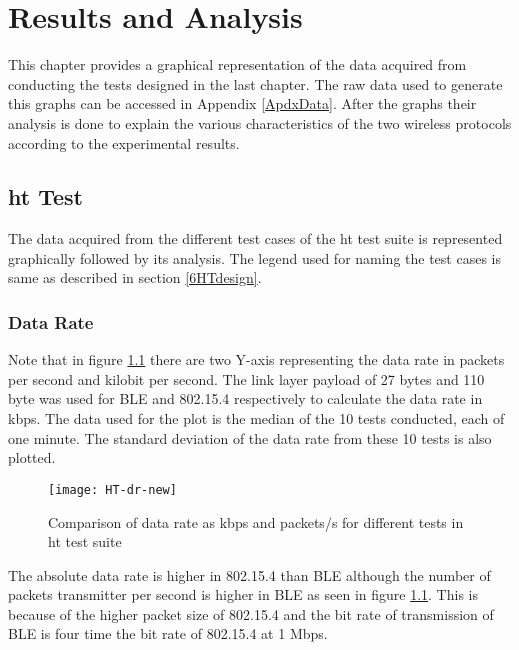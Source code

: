 \chapter{Results and Analysis} \label{7ResultsAnalysis}
This chapter provides a graphical representation of the data acquired from conducting the tests designed in the last chapter. The raw data used to generate this graphs can be accessed in Appendix \ref{ApdxData}. After the graphs their analysis is done to explain the various characteristics of the two wireless protocols according to the experimental results.

\section{\texorpdfstring{\acrlong{ht}}{High-Throughput} Test}
The data acquired from the different test cases of the \gls{ht} test suite is represented graphically followed by its analysis. The legend used for naming the test cases is same as described in section \ref{6HTdesign}.

\subsection{Data Rate}

Note that in figure \ref{fig:HT-dr} there are two Y-axis representing the data rate in packets per second and kilobit per second. The link layer payload of 27 bytes and 110 byte was used for BLE and 802.15.4 respectively to calculate the data rate in kbps. The data used for the plot is the median of the 10 tests conducted, each of one minute. The standard deviation of the data rate from these 10 tests is also plotted. 
\begin{figure}[tb]
\texttt{[image: HT-dr-new]}
\caption{Comparison of data rate as kbps and packets/s for different tests in \gls{ht} test suite}
\label{fig:HT-dr}

\end{figure}

The absolute data rate is higher in 802.15.4 than BLE although the number of packets transmitter per second is higher in BLE as seen in figure \ref{fig:HT-dr}. This is because of the higher packet size of 802.15.4 and the bit rate of transmission of BLE is four time the bit rate of 802.15.4 at 1 Mbps.

